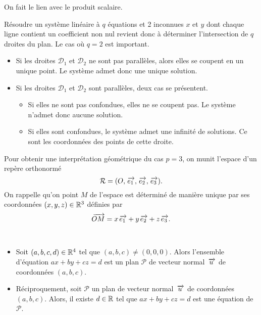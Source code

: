 \documentclass{magnoliaold}
\begin{document}
\begin{preuve}
On fait le lien avec le produit scalaire. 
\end{preuve}

Résoudre un système linéaire à $q$ équations et 2 inconnues $x$ et $y$ dont chaque ligne contient un coefficient non nul revient donc à déterminer l'intersection de $q$ droites du plan. Le cas où $q=2$ est important.
\begin{itemize}
\item Si les droites $\mathcal{D}_1$ et $\mathcal{D}_2$ ne sont pas parallèles, alors elles se coupent en un unique point. Le système admet donc une unique solution.
\item Si les droites $\mathcal{D}_1$ et $\mathcal{D}_2$ sont parallèles, deux cas se présentent.
\begin{itemize}
\item Si elles ne sont pas confondues, elles ne se coupent pas. Le système n'admet donc aucune solution.
\item Si elles sont confondues, le système admet une infinité de solutions. Ce sont les coordonnées des points de cette droite.
\end{itemize}
\end{itemize}


Pour obtenir une interprétation géométrique du cas $p=3$, on munit l'espace d'un repère orthonormé \[\mathcal{R}=(O,\kern 2pt\overrightarrow{\kern -2pte_1},\kern 2pt\overrightarrow{\kern -2pte_2},\kern 2pt\overrightarrow{\kern -2pte_3}).\] On rappelle qu'on point $M$ de l'espace est déterminé de manière unique par ses coordonnées $(x,y,z)\in\mathbb{R}^3$ définies par \[\kern 2pt\overrightarrow{\kern -2ptOM}=x\kern 2pt\overrightarrow{\kern -2pte_1}+y\kern 2pt\overrightarrow{\kern -2pte_2}+z\kern 2pt\overrightarrow{\kern -2pte_3}.\]

\begin{proposition}
\ 
\begin{itemize}
\item Soit $(a,b,c,d)\in\mathbb{R}^4$ tel que $(a,b,c)\neq(0,0,0)$. Alors l'ensemble d'équation $ax+by+cz=d$ est un plan $\mathcal{P}$ de vecteur normal $\kern 2pt\overrightarrow{\kern -2ptu}$ de coordonnées $(a,b,c)$.
\item Réciproquement, soit $\mathcal{P}$ un plan de vecteur normal $\kern 2pt\overrightarrow{\kern -2ptu}$ de coordonnées $(a,b,c)$. Alors, il existe $d\in\mathbb{R}$ tel que $ax+by+cz=d$ est une équation de $\mathcal{P}$.
\end{itemize}
\end{proposition}
\end{document}

